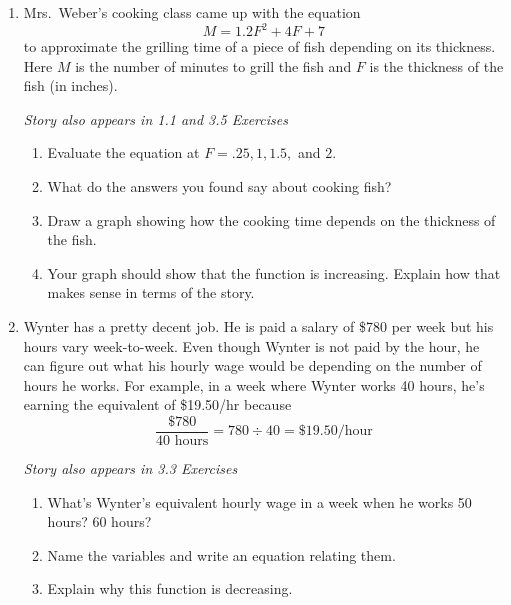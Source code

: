 \begin{enumerate}
\item Mrs.\ Weber's cooking class came up with the equation $$M = 1.2F^2+4F+7$$ to approximate the grilling time of a piece of fish depending on its thickness.  Here $M$ is the number of minutes to grill the fish and $F$ is the thickness of the fish (in inches).  

\hfill \emph{Story also appears in 1.1 and 3.5 Exercises}
\begin{enumerate}
\item Evaluate the equation at $F=.25, 1, 1.5,$ and $2$.
\item What do the answers you found say about cooking fish?
\item Draw a graph showing how the cooking time depends on the thickness of the fish.
\item Your graph should show that the function is increasing.  Explain how that makes sense in terms of the story.
\end{enumerate} 

\item Wynter has a pretty decent job. He is paid a salary of \$780 per week but his hours vary week-to-week. Even though Wynter is not paid by the hour, he can figure out what his hourly wage would be depending on the number of hours he works.  For example, in a week where Wynter works 40 hours, he's earning the equivalent of \$19.50/hr because $$\frac{\$780}{40 \text{ hours}} = 780 \div 40 =\$19.50\text{/hour}$$

\hfill \emph{Story also appears in 3.3 Exercises}
\begin{enumerate}
\item What's Wynter's equivalent hourly wage in a week when he works 50 hours? 60 hours?
\item Name the variables and write an equation relating them.
\item Explain why this function is decreasing.
\end{enumerate} 


\end{enumerate}
